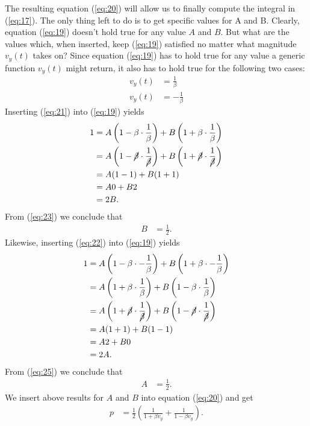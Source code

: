 \documentclass[paper=a4, fontsize=11pt]{scrartcl} %
\numberwithin{equation}{section} %
\numberwithin{figure}{section} %
\numberwithin{table}{section} %
\begin{document}
The resulting equation (\ref{eq:20}) will allow us to finally compute the integral in (\ref{eq:17}). The only thing left to do is to get
specific values for A and B. Clearly, equation (\ref{eq:19}) doesn't hold true for any value $A$ and $B$. But what are the values which, when
inserted, keep (\ref{eq:19}) satisfied no matter what magnitude $v_y(t)$ takes on? Since equation (\ref{eq:19}) has to hold true
for any value a generic function $v_y(t)$ might return, it also has to hold true for the following two cases:
\begin{align}
v_y(t) &= \frac{1}{\beta}  \label{eq:21} \\
v_y(t) &= - \frac{1}{\beta} \label{eq:22}
\end{align}
Inserting (\ref{eq:21}) into (\ref{eq:19}) yields
\begin{align} 
1 &= A \left(1 - \beta \cdot \frac{1}{\beta}\right) + B \left(1 + \beta \cdot \frac{1}{\beta}\right) \\
  &= A \left(1 - \cancel{\beta} \cdot \frac{1}{\cancel{\beta}}\right) + B \left(1 + \cancel{\beta} \cdot \frac{1}{\cancel{\beta}}\right) \\
  &= A (1 - 1) + B (1 + 1) \\
  &= A 0 + B 2 \\
  &= 2B. \label{eq:23}
\end{align}
From (\ref{eq:23}) we conclude that
\begin{align}
B &= \frac{1}{2}.  \label{eq:24}
\end{align}
Likewise, inserting (\ref{eq:22}) into (\ref{eq:19}) yields
\begin{align} 
1 &= A \left(1 - \beta \cdot -\frac{1}{\beta}\right) + B \left(1 + \beta \cdot -\frac{1}{\beta}\right) \\
  &= A \left(1 + \beta \cdot \frac{1}{\beta}\right) + B \left(1 - \beta \cdot \frac{1}{\beta}\right) \\
  &= A \left(1 + \cancel{\beta} \cdot \frac{1}{\cancel{\beta}}\right) + B \left(1 - \cancel{\beta} \cdot \frac{1}{\cancel{\beta}}\right) \\
  &= A (1 + 1) + B (1 - 1) \\
  &= A 2 + B 0 \\
  &= 2A. \label{eq:25}
\end{align}
From (\ref{eq:25}) we conclude that
\begin{align}
A &= \frac{1}{2}.  \label{eq:24}
\end{align}
We insert above results for $A$ and $B$ into equation (\ref{eq:20}) and get
\begin{align}
  p &= \frac{1}{2}\left(\frac{1}{1 + \beta v_y} + \frac{1}{1 - \beta v_y}\right). \label{eq:25}
\end{align}
\end{document}
